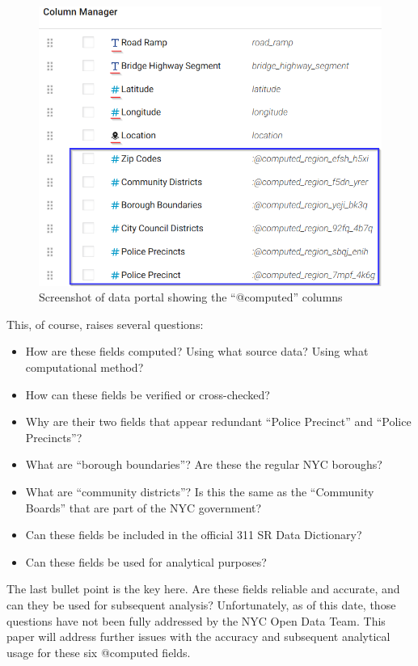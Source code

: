 \documentclass[12pt, titlepage]{article}
\begin{document}
	\begin{figure}[htbp]
	  \centering
		  \includegraphics[scale=0.65]{computed_columns_screenshot.png}
		  \caption{Screenshot of data portal showing the ``@computed'' columns}
		  \label{fig:computed-columns}
	\end{figure}

	This, of course, raises several questions:
	\begin{itemize}
		\item How are these fields computed? Using what source data? Using what computational method?
		\item How can these fields be verified or cross-checked?
		\item Why are their two fields that appear redundant ``Police Precinct'' and ``Police Precincts''?
		\item What are ``borough boundaries''? Are these the regular NYC boroughs?
		\item What are ``community districts''? Is this the same as the ``Community Boards'' that are part of the NYC government?
		\item Can these fields be included in the official 311 SR Data Dictionary?
		\item Can these fields be used for analytical purposes? 
	\end{itemize}	

	The last bullet point is the key here. Are these fields reliable and accurate, and can they be used for subsequent analysis? Unfortunately,
	as of this date, those questions have not been fully addressed by the  NYC Open Data Team. This paper will address further issues with the
	accuracy and subsequent analytical usage for these six @computed fields.
	
\end{document}
